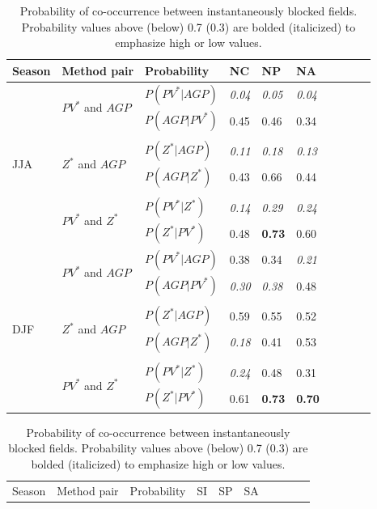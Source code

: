 \documentclass[smallextended]{svjour3}       %
\numberwithin{equation}{section}
\begin{document}
\begin{table}
\centering
\caption{Probability of co-occurrence between instantaneously blocked fields. Probability values above (below) 0.7 (0.3) are bolded (italicized) to emphasize high or low values. }
\label{probtabcol}
\begin{tabular}{|l|l|l|l|l|l|l|l|l|l|}
\hline
Season & Method pair & Probability & NC    & NP    & NA      \\ \hline
\multirow{8}{*}{JJA} 
   & \multirow{2}{*}{$PV^* $ and $AGP$}&$P(PV^*|AGP)$ & \textit{0.04} & \textit{0.05} & \textit{{0.04}}  \\  
   & & $P(AGP|PV^*)$ & {0.45} & {0.46} & {0.34}  \\ 
   &&&&&\\
   & \multirow{2}{*}{$Z^*$ and $AGP$} &$P(Z^*|AGP)$    & \textit{{0.11}} & \textit{{0.18}} & \textit{{0.13} } \\  
   &&$P(AGP|Z^*)$   & {0.43} & {0.66} & {0.44} \\ 
      &&&&&\\
      & \multirow{2}{*}{$PV^*$ and $Z^*$ } &$P(PV^*|Z^*)$    & \textit{0.14}& \textit{0.29}& \textit{{0.24}} \\ 
   &&$P(Z^*|PV^*)$   & {0.48} & \textbf{{0.73}} & 0.60  \\ 
  
  \hline
  \multirow{8}{*}{DJF} 
   & \multirow{2}{*}{$PV^* $ and $AGP$}&$P(PV^*|AGP)$ & {0.38} & {0.34} &\textit{{0.21}}  \\
   & & $P(AGP|PV^*)$& \textit{{0.30}} &\textit{0.38}& {0.48}\\ 
      &&&&&\\
   & \multirow{2}{*}{$Z^*$ and $AGP$} &$P(Z^*|AGP)$ & {0.59} &0.55& {0.52} \\ 
   &&$P(AGP|Z^*)$   & \textit{{0.18} }& {0.41} & 0.53 \\ 
      &&&&&\\
      & \multirow{2}{*}{$PV^*$ and $Z^*$ } &$P(PV^*|Z^*)$    & \textit{0.24} & {0.48} & {0.31} \\
   &&$P(Z^*|PV^*)$   & {0.61} & \textbf{0.73} & \textbf{0.70}  \\   
  \hline
\end{tabular}
\begin{tabular}{|l|l|l|l|l|l|l|l|l|l|}
\hline
  Season & Method pair & Probability & SI    & SP    & SA    \\ 
  

\end{tabular}
\end{table}
\end{document}
